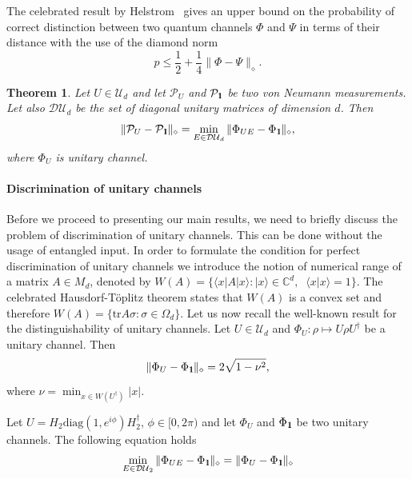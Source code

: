 \documentclass[preprint,12pt, a4paper]{elsarticle}
\newcommand{\ket}[1]{\ensuremath{|#1\rangle}}
\newcommand{\bra}[1]{\ensuremath{\langle#1|}}
\newcommand{\braket}[2]{\ensuremath{\langle{#1}|{#2}\rangle}}
\newcommand{\1}{{\rm 1\hspace{-0.9mm}l}}
\newcommand{\Id}{{\rm 1\hspace{-0.9mm}l}}
\newcommand{\PP}{\mathcal{P}}
\newcommand{\UU}{\mathcal{U}}
\newcommand{\diaguni}{\ensuremath{\mathcal{DU}}}
\newcommand{\diag}{\mathrm{diag}}
\newcommand{\tr}{\mathrm{tr}}
\newtheorem{theorem}{Theorem}
\newtheorem{proposition}{Proposition}
\begin{document}
The celebrated result by Helstrom~\cite{helstrom1976quantum} gives an upper
bound on the probability of correct distinction between two quantum channels
$\Phi$ and $\Psi$ in terms of their distance with the use of the diamond norm
\begin{equation}
p \leq \frac12 + \frac14 \| \Phi - \Psi \|_\diamond.
\end{equation}


\begin{theorem}
Let $U\in \UU_d$ and let $\PP_U$ and $\PP_\Id$ be two von Neumann 
measurements. 
Let also 
$\diaguni_d$ be the set of diagonal unitary matrices of dimension $d$. Then
\begin{equation}
\|\PP_U - \PP_\Id\|_\diamond = \min_{E \in \diaguni_d} \|\Phi_{UE} - 
\Phi_\Id\|_\diamond,
\end{equation}
where $\Phi_U$ is unitary channel.
\end{theorem}


\paragraph{Discrimination of unitary channels}

Before we proceed to presenting our main results, we need to briefly discuss the
problem of discrimination of unitary channels. This can be done without the
usage of entangled input. In order to formulate the condition for perfect
discrimination of unitary channels we introduce the notion of numerical range of
a matrix $A \in M_d$, denoted by $W(A) =\{\bra{x}A\ket{x}: \ket{x} \in 
\mathbb{C}^d, \;
\;\braket{x}{x}=1\}$. The celebrated Hausdorf-T\"oplitz
theorem states that
$W(A)$ is a convex set and therefore $W(A) =\{\tr A \sigma : \sigma \in \Omega_d
\}$. Let us now recall the well-known result for the
distinguishability of unitary channels.
	Let $U \in \UU_d$ and $\Phi_U: \rho \mapsto U \rho U^\dagger$ be a unitary 
	channel. 
	Then 
	\begin{equation}
	\| \Phi_U  - \Phi_{\1} \|_\diamond = 2 \sqrt{1-\nu^2},
	\end{equation}
	where $\nu = \min_{x \in W(U^\dagger)} |x|  $. 

 Let $U = H_2 \diag(1, e^{i \phi}) H_2^\dagger$, $\phi \in [0, 2\pi)$ and	let 
 $\Phi_U$ and $\Phi_\Id$ be two unitary channels. The following equation holds 
	\begin{equation}
	\min_{E \in \diaguni_2} \|\Phi_{UE} - 
	\Phi_\Id\|_\diamond = \|\Phi_{U} - 
	\Phi_\Id\|_\diamond
	\end{equation}
\end{document}
